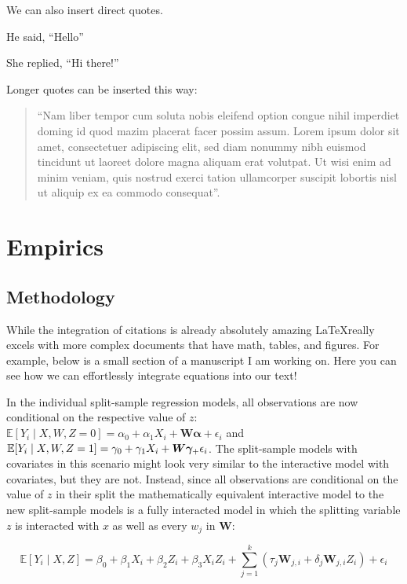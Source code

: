 \documentclass{article}
\begin{document}
We can also insert direct quotes. 

He said, ``Hello'' \citep[p. 10]{smith2020impact}

She replied, ``Hi there!''  \citep[p. 11]{smith2020impact}


Longer quotes can be inserted this way:

\begin{quote}
``Nam liber tempor cum soluta nobis eleifend option congue nihil imperdiet doming id quod mazim placerat facer possim assum. Lorem ipsum dolor sit amet, consectetuer adipiscing elit, sed diam nonummy nibh euismod tincidunt ut laoreet dolore magna aliquam erat volutpat. Ut wisi enim ad minim veniam, quis nostrud exerci tation ullamcorper suscipit lobortis nisl ut aliquip ex ea commodo consequat''\citep[p. 10]{smith2020impact}.
\end{quote}

\newpage
\section{Empirics}
\label{sec:empirics}

\subsection{Methodology}
\label{sec:methods}

While the integration of citations is already absolutely amazing \LaTeX really excels with more complex documents that have math, tables, and figures. For example, below is a small section of a manuscript I am working on. Here you can see how we can effortlessly integrate equations into our text! 


In the individual split-sample regression models, all observations are now conditional on the respective value of $z$: $\mathbb{E}[Y_{i} \mid X, W,Z = 0]  = \alpha_{0} + \alpha_{1}X_{i} + \bm{W \alpha} + \epsilon_{i}$ and $ \mathbb{E}[Y_{i} \mid X, W,Z = 1]  = \gamma_{0} + \gamma_{1}X_{i} + \bm{W\gamma_}  + \epsilon_{i}$. The split-sample models with covariates in this scenario might look very similar to the interactive model with covariates, but they are not. Instead, since all observations are conditional on the value of $z$ in their split the mathematically equivalent interactive model to the new split-sample models is a fully interacted model in which the splitting variable $z$ is interacted with $x$ as well as every $w_j$ in $\bm{W}$: \useshortskip

\begin{equation}
\label{eq:interaction_model_full}
 \mathbb{E}[Y_{i} \mid X,Z]  = \beta_{0} + \beta_{1}X_{i} + \beta_{2}Z_{i}  + \beta_{3} X_{i}Z_{i} + \sum_{j=1}^{k} (\tau_{j} \bm{W}_{j,i} + \delta_{j} \bm{W}_{j,i} Z_{i}) + \epsilon_{i}   
\end{equation}
\end{document}
